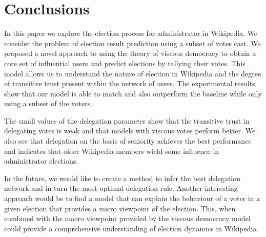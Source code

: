 \section{Conclusions}
\label{sec:conclusion}
In this paper we explore the election process for administrator in Wikipedia. We consider the problem of election result prediction using a subset of votes cast. We proposed a novel approach to using the theory of viscous democracy to obtain a core set of influential users and predict elections by tallying their votes. This model allows us to understand the nature of election in Wikipedia and the degree of transitive trust present within the network of users. The experimental results show that our model is able to match and also outperform the baseline while only using a subset of the voters.

The small values of the delegation parameter show that the transitive trust in delegating votes is weak and that models with viscous votes perform better. We also see that delegation on the basis of seniority achieves the best performance and indicates that older Wikipedia members wield some influence in administrator elections.

In the future, we would like to create a method to infer the best delegation network and in turn the most optimal delegation rule. Another interesting approach would be to find a model that can explain the behaviour of a voter in a given election that provides a micro viewpoint of the election. This, when combined with the macro viewpoint provided by the viscous democracy model could provide a comprehensive understanding of election dynamics in Wikipedia.